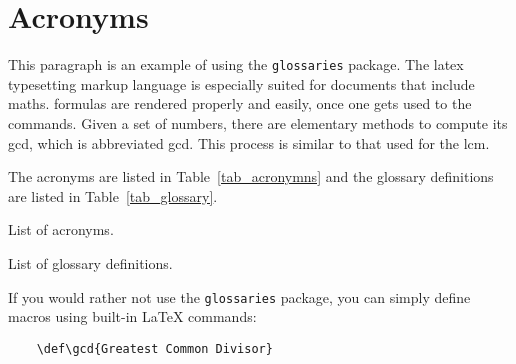 \chapter{Acronyms}

This paragraph is an example of using the \verb|glossaries| package. The
\Gls{latex} typesetting markup language is especially suited for documents that
include \gls{maths}. \Glspl{formula} are rendered properly and easily, once one
gets used to the commands. Given a set of numbers, there are elementary methods
to compute its \acrlong{gcd}, which is abbreviated \acrshort{gcd}. This process
is similar to that used for the \acrfull{lcm}.

The acronyms are listed in Table~\ref{tab_acronymns} and the glossary
definitions are listed in Table~\ref{tab_glossary}.

\begin{table}[htbp!]
    \centering
    \caption{List of acronyms.}
    \printglossary[type=\acronymtype]
    \label{tab_acronymns}
\end{table}

\begin{table}[htbp!]
    \centering
    \caption{List of glossary definitions.}
    \printglossary
    \label{tab_glossary}
\end{table}

If you would rather not use the \verb|glossaries| package, you can simply define macros using built-in \LaTeX{} commands:
\begin{verbatim}
    \def\gcd{Greatest Common Divisor}
\end{verbatim}